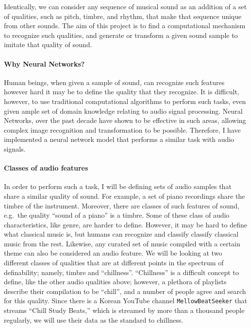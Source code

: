 \documentclass[12pt,a4paper,]{report}
\begin{document}
Identically, we can consider any sequence of musical sound as an
addition of a set of qualities, such as pitch, timbre, and rhythm, that
make that sequence unique from other sounds. The aim of this project is
to find a computational mechanism to recognize such qualities, and
generate or transform a given sound sample to imitate that quality of
sound.

\paragraph{Why Neural Networks?}

Human beings, when given a sample of sound, can recognize such features
however hard it may be to define the quality that they recognize. It is
difficult, however, to use traditional computational algorithms to
perform such tasks, even given ample set of domain knowledge relating to
audio signal processing. Neural Networks, over the past decade have
shown to be effective in such areas, allowing complex image recognition
and transformation to be possible. Therefore, I have implemented a
neural network model that performs a similar task with audio signals.

\paragraph{Classes of audio features}

In order to perform such a task, I will be defining sets of audio
samples that share a similar quality of sound. For example, a set of
piano recordings share the timbre of the instrument. Moreover, there are
classes of such features of sound, e.g.~the quality ``sound of a piano''
is a timbre. Some of these class of audio characteristics, like genre,
are harder to define. However, it may be hard to define what classical
music is, but humans can recognize and classify classify classical music
from the rest. Likewise, any curated set of music compiled with a
certain theme can also be considered an audio feature. We will be
looking at two different classes of qualities that are at different
points in the spectrum of definability; namely, timbre and
``chillness''. ``Chillness'' is a difficult concept to define, like the
other audio qualities above; however, a plethora of playlists describe
their compilation to be ``chill'', and a number of people agree and
search for this quality. Since there is a Korean YouTube channel
\texttt{MellowBeatSeeker} that streams ``Chill Study Beats,'' which is
streamed by more than a thousand people regularly, we will use their
data as the standard to chillness.\\
\end{document}
